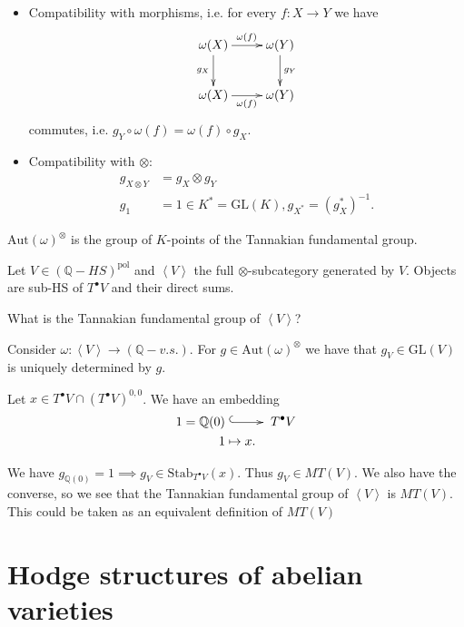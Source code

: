 \begin{itemize}
\item
Compatibility with morphisms,
i.e. for every $f:X \to Y$ we have
$$
\xymatrix{
  \omega(X)\ar[r]^{\omega(f)}\ar[d]_{g_X}
&\omega(Y)\ar[d]^{g_Y}\\
\omega(X)\ar[r]_{\omega(f)}
&\omega(Y)
}
$$
commutes, i.e. $g_Y \circ \omega(f)=\omega(f)
\circ g_X$.

\item Compatibility with $\otimes$:
$$
\begin{aligned}
g_{X \otimes Y}&=g_X \otimes g_Y\\
g_1&=1 \in K^* = \text{GL}(K),
  g_{X^*}=(g^*_X)^{-1}.
\end{aligned}
$$
\end{itemize}

\noindent
$\text{Aut}(\omega)^\otimes$ is the group of
$K$-points of
the Tannakian fundamental group.

\medskip{}

Let $V \in (\mathbb{Q}-HS)^{\text{pol}}$
and $\left\langle{}V\right\rangle{}$ the full
$\otimes$-subcategory generated by $V$.
Objects are sub-HS of $T^\bullet V$ and their
direct sums.

What is the Tannakian fundamental group of
$\left\langle{}V\right\rangle{}$?

Consider $\omega:\left\langle{}V\right\rangle{}\to
(\mathbb{Q}-v.s.)$.
For $g \in \text{Aut}(\omega)^{\otimes}$
we have that $g_V \in \text{GL}(V)$
is uniquely determined by $g$.

Let $x \in T^\bullet V \cap(T^\bullet
V)^{0,0}$.
We have an embedding
$$
\begin{aligned}
1=\mathbb{Q}(0)&\xymatrix{\ar@{^{(}->}[r]&}
T^\bullet
V\\
1 & \mapsto x.
\end{aligned}
$$

\noindent
We have $g_{\mathbb{Q}(0)}=1 \implies g_V \in
\text{Stab}_{T^\bullet V}(x)$.
Thus  $g_V \in MT(V)$.
We also have the converse, so we see that
the Tannakian fundamental group of
$\left\langle{}V\right\rangle{}$
is $MT(V)$.
This could be taken as an equivalent
definition of $MT(V)$


\section{Hodge structures of abelian
varieties}
\label{section-hodge-struc-abeli-varie}

